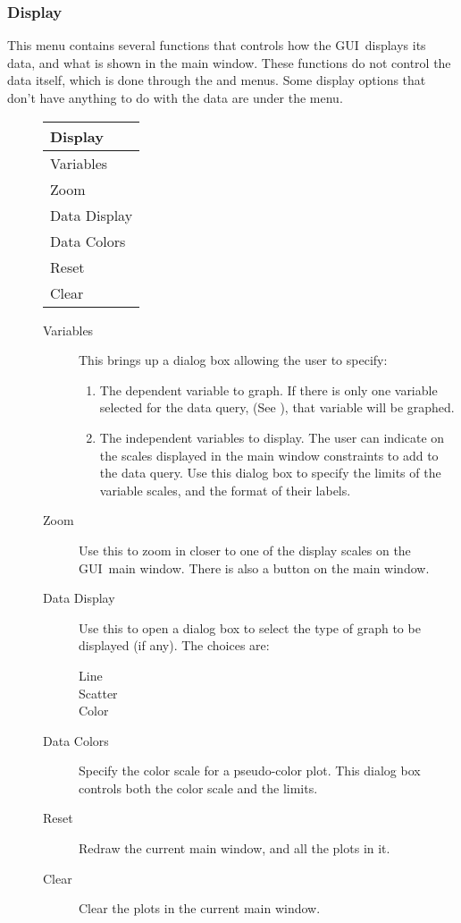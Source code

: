 \documentclass[10pt]{report}
\newcommand{\gui}{GUI}
\begin{document}
\subsubsection{Display}
\label{sec:menu:display}
This menu contains several functions that controls how the \gui\ 
displays its data, and what is shown in the main window.  These
functions do not control the data itself, which is done through the
\but{View} and \but{Query} menus.  Some display options that don't
have anything to do with the data are under the \but{Options} menu.
\begin{description}
\item[] 
  \begin{center}
    \begin{tabular}[c]{|l|} \hline
      \textbf{Display} \\ \hline
      Variables \\
      Zoom \\
      Data Display \\
      Data Colors \\
      Reset \\
      Clear \\ \hline
    \end{tabular}
  \end{center}
  \begin{description}
  \item[Variables] This brings up a dialog box allowing the user to
    specify:
    \begin{enumerate}
    \item The dependent variable to graph.  If there is only one
      variable selected for the data query, (See
      ), that variable will be graphed.
    \item The independent variables to display.  The user can indicate
      on the scales displayed in the main window constraints to add to
      the data query.  Use this dialog box to specify the limits of
      the variable scales, and the format of their labels.
    \end{enumerate}
  \item[Zoom] Use this to zoom in closer to one of the display scales
    on the \gui\ main window.  There is also a \but{Zoom} button on
    the main window.
  \item[Data Display] Use this to open a dialog box to select the type
    of graph to be displayed (if any).  The choices are:
    \begin{description}
    \item[Line] 
    \item[Scatter] 
    \item[Color] 
    \end{description}
  \item[Data Colors] Specify the color scale for a pseudo-color plot.
    This dialog box controls both the color scale and the limits.
  \item[Reset] Redraw the current main window, and all the plots in it.
  \item[Clear] Clear the plots in the current main window.
  \end{description}
\end{description}
\end{document}
